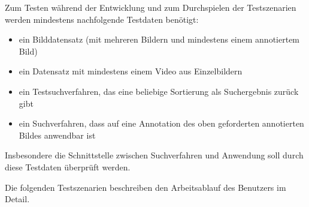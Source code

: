 Zum Testen während der Entwicklung und zum Durchspielen der Testszenarien werden mindestens nachfolgende Testdaten benötigt:
\begin{itemize}
	\item ein Bilddatensatz (mit mehreren Bildern und mindestens einem annotiertem Bild)
	\item ein Datensatz mit mindestens einem Video aus Einzelbildern
	\item ein Testsuchverfahren, das eine beliebige Sortierung als Suchergebnis zurück gibt
	\item ein Suchverfahren, dass auf eine Annotation des oben geforderten annotierten Bildes anwendbar ist
\end{itemize}
Insbesondere die Schnittstelle zwischen Suchverfahren und Anwendung soll durch diese Testdaten überprüft werden.

Die folgenden Testszenarien beschreiben den Arbeitsablauf des Benutzers im Detail.

